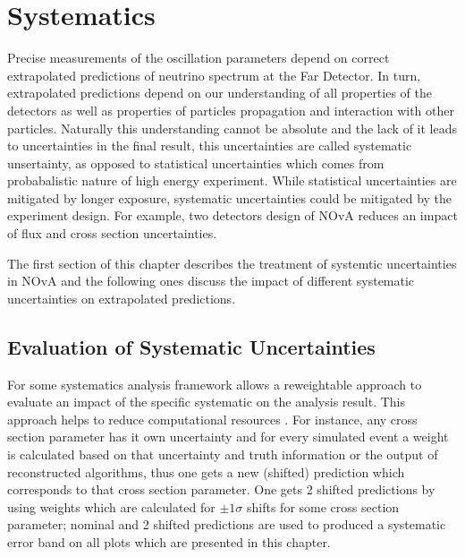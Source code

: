 \chapter{Systematics}
\label{systematic_chapter}

Precise measurements of the oscillation parameters depend on correct extrapolated predictions of neutrino spectrum at 
the Far Detector. In turn, extrapolated predictions depend on our understanding of all properties of the detectors as
well as properties of particles propagation and interaction with other particles. Naturally this understanding cannot 
be absolute and the lack of it leads to uncertainties in the final result, this uncertainties are called systematic 
unsertainty, as opposed to statistical uncertainties which comes from probabalistic nature of high energy experiment.
While statistical uncertainties are mitigated by longer exposure, systematic uncertainties could be mitigated by the
experiment design. For example, two detectors design of NOvA reduces an impact of flux and cross section uncertainties.

The first section of this chapter describes the treatment of systemtic uncertainties in NOvA and the following ones
discuss the impact of different systematic uncertainties on extrapolated predictions.

\section{Evaluation of Systematic Uncertainties}
For some systematics analysis framework allows a reweightable approach to evaluate an impact of the specific systematic
on the analysis result. This approach helps to reduce computational resources \cite{cafana}. For instance, any cross section 
parameter has it own uncertainty and for every simulated event a weight is calculated based on that uncertainty and 
truth information or the output of reconstructed algorithms, thus one gets a new (shifted) prediction which 
corresponds to that cross section parameter. One gets 2 shifted predictions by using weights which are calculated for 
$\pm 1\sigma$ shifts for some cross section parameter; nominal and 2 shifted predictions are used to produced a 
systematic error band on all plots which are presented in this chapter. 

